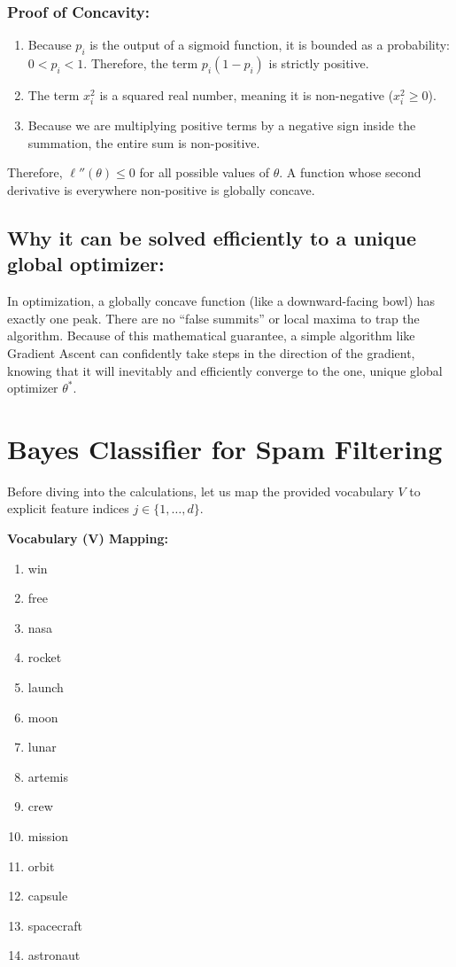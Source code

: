\documentclass[twoside, 10pt]{article}
\begin{document}
\subsubsection{Proof of Concavity:}
\begin{enumerate}
    \item Because $p_i$ is the output of a sigmoid function, it is bounded as a probability: $0 < p_i < 1$. Therefore, the term $p_i(1 - p_i)$ is strictly positive.
    \item The term $x_i^2$ is a squared real number, meaning it is non-negative ($x_i^2 \geq 0$).
    \item Because we are multiplying positive terms by a negative sign inside the summation, the entire sum is non-positive.
\end{enumerate}
Therefore, $\ell''(\theta) \leq 0$ for all possible values of $\theta$. A function whose second derivative is everywhere non-positive is globally concave.
\subsection*{Why it can be solved efficiently to a unique global optimizer:} 
In optimization, a globally concave function (like a downward-facing bowl) has exactly one peak. There are no ``false summits'' or local maxima to trap the algorithm. Because of this mathematical guarantee, a simple algorithm like Gradient Ascent can confidently take steps in the direction of the gradient, knowing that it will inevitably and efficiently converge to the one, unique global optimizer $\theta^*$.

\section{Bayes Classifier for Spam Filtering}
Before diving into the calculations, let us map the provided vocabulary $V$ to explicit feature indices $j \in \{1, \dots, d\}$.

\noindent\textbf{Vocabulary (V) Mapping:}
\begin{enumerate}
    \item win
    \item free
    \item nasa
    \item rocket
    \item launch
    \item moon
    \item lunar
    \item artemis
    \item crew
    \item mission
    \item orbit
    \item capsule
    \item spacecraft
    \item astronaut
\end{enumerate}
\end{document}
